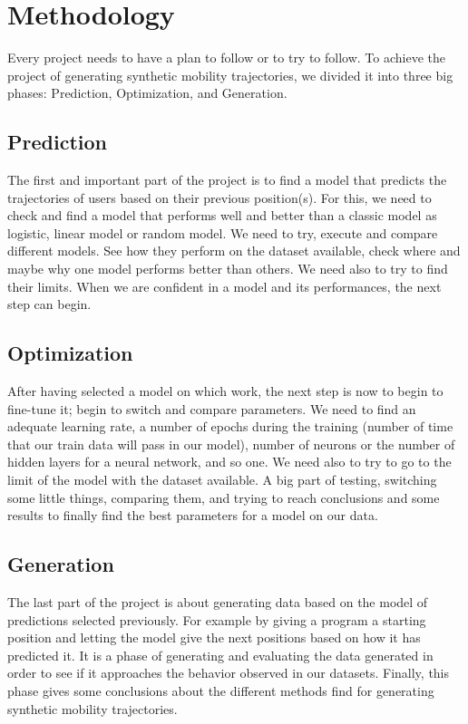 \documentclass[a4]{article}
\begin{document}
\newpage
\section{Methodology}
Every project needs to have a plan to follow or to try to follow. To achieve the project of generating synthetic mobility trajectories, we divided it into three big phases: Prediction, Optimization, and Generation.

\subsection{Prediction}
The first and important part of the project is to find a model that predicts the trajectories of users based on their previous position(s). For this, we need to check and find a model that performs well and better than a classic model as logistic, linear model or random model. We need to try, execute and compare different models. See how they perform on the dataset available, check where and maybe why one model performs better than others. We need also to try to find their limits. When we are confident in a model and its performances, the next step can begin.

\subsection{Optimization}
After having selected a model on which work, the next step is now to begin to fine-tune it; begin to switch and compare parameters. We need to find an adequate learning rate, a number of epochs during the training (number of time that our train data will pass in our model), number of neurons or the number of hidden layers for a neural network, and so one. We need also to try to go to the limit of the model with the dataset available. A big part of testing, switching some little things, comparing them, and trying to reach conclusions and some results to finally find the best parameters for a model on our data.

\subsection{Generation}
The last part of the project is about generating data based on the model of predictions selected previously. For example by giving a program a starting position and letting the model give the next positions based on how it has predicted it. It is a phase of generating and evaluating the data generated in order to see if it approaches the behavior observed in our datasets. Finally, this phase gives some conclusions about the different methods find for generating synthetic mobility trajectories.
\end{document}
